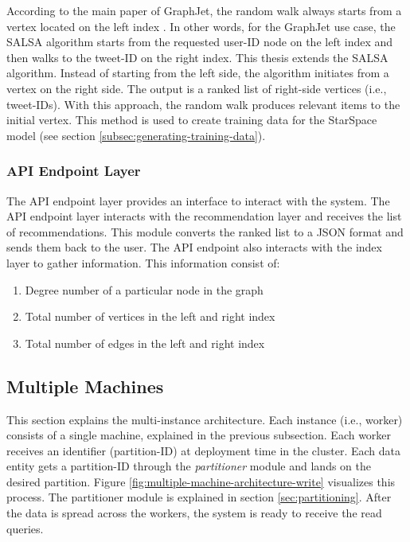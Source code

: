 According to the main paper of GraphJet, the random walk always starts from a vertex located on the left index \cite{sharmaGraphJetRealtimeContent2016}. In other words, for the GraphJet use case, the SALSA algorithm starts from the requested user-ID node on the left index and then walks to the tweet-ID on the right index. This thesis extends the SALSA algorithm. Instead of starting from the left side, the algorithm initiates from a vertex on the right side. The output is a ranked list of right-side vertices (i.e., tweet-IDs). With this approach, the random walk produces relevant items to the initial vertex. This method is used to create training data for the StarSpace model (see section \ref{subsec:generating-training-data}).

\subsubsection{API Endpoint Layer}
\label{subsubsec:api-endpoint-layer}
The API endpoint layer provides an interface to interact with the system. The API endpoint layer interacts with the recommendation layer and receives the list of recommendations. This module converts the ranked list to a JSON format and sends them back to the user.
The API endpoint also interacts with the index layer to gather information. This information consist of:

\begin{enumerate}
    \item Degree number of a particular node in the graph
    \item Total number of vertices in the left and right index
    \item Total number of edges in the left and right index
\end{enumerate}

\subsection{Multiple Machines}
\label{subsec:multiple-machines}
This section explains the multi-instance architecture. Each instance (i.e., worker) consists of a single machine, explained in the previous subsection. Each worker receives an identifier (partition-ID) at deployment time in the cluster. Each data entity gets a partition-ID through the \emph{partitioner} module and lands on the desired partition. Figure \ref{fig:multiple-machine-architecture-write} visualizes this process. The partitioner module is explained in section \ref{sec:partitioning}. After the data is spread across the workers, the system is ready to receive the read queries. 


